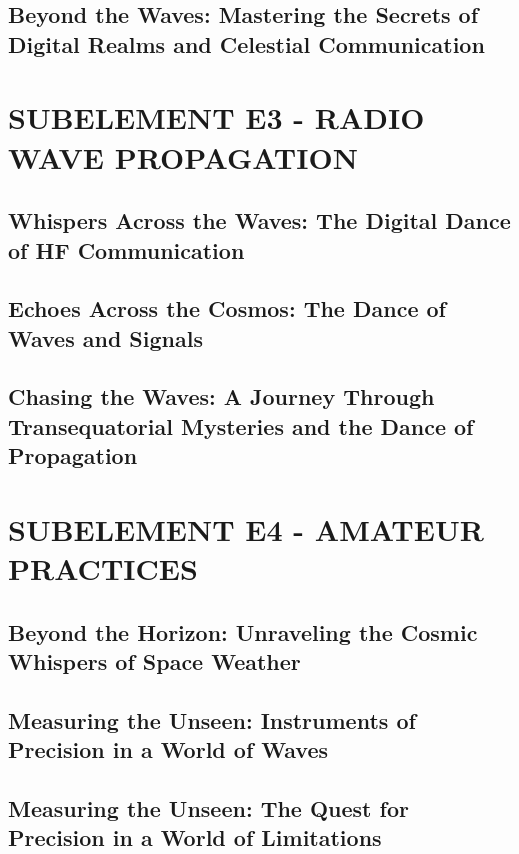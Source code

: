 \documentclass[12pt]{book}
\begin{document}
\section{Beyond the Waves: Mastering the Secrets of Digital Realms and Celestial Communication}
\chapter{SUBELEMENT E3 - RADIO WAVE PROPAGATION}
\section{Whispers Across the Waves: The Digital Dance of HF Communication}
\section{Echoes Across the Cosmos: The Dance of Waves and Signals}
\section{Chasing the Waves: A Journey Through Transequatorial Mysteries and the Dance of Propagation}
\chapter{SUBELEMENT E4 - AMATEUR PRACTICES}
\section{Beyond the Horizon: Unraveling the Cosmic Whispers of Space Weather}
\section{Measuring the Unseen: Instruments of Precision in a World of Waves}











\section{Measuring the Unseen: The Quest for Precision in a World of Limitations}










\end{document}
